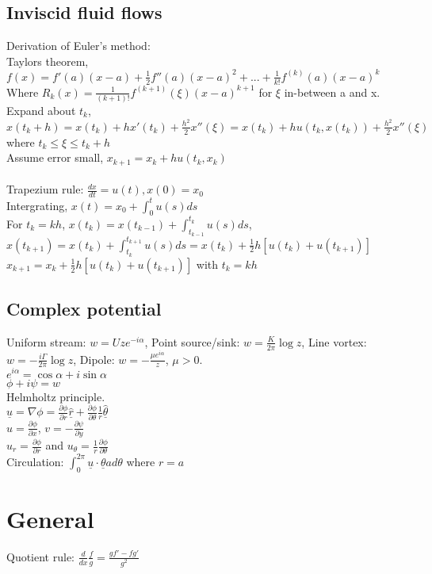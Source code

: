 \documentclass[1pt]{article}
\begin{document}
\subsection*{Inviscid fluid flows}
Derivation of Euler's method:
\\Taylors theorem, $f(x)=f'(a)(x-a)+\frac{1}{2}f''(a)(x-a)^2+...+\frac{1}{k!}f^{(k)}(a)(x-a)^k$
\\ Where $R_k(x)=\frac{1}{(k+1)!}f^{(k+1)}(\xi)(x-a)^{k+1}$ for $\xi$ in-between a and x.
\\Expand about $t_k$, $x(t_k+h)=x(t_k)+hx'(t_k)+\frac{h^2}{2}x''(\xi)=x(t_k)+hu(t_k,x(t_k))+\frac{h^2}{2}x''(\xi)$ where $t_k \leq \xi \leq t_k+h$
\\Assume error small, $x_{k+1}=x_k+hu(t_k,x_k)$
\\
\\Trapezium rule: $\frac{dx}{dt}=u(t), x(0)=x_0$
\\ Intergrating, $x(t)=x_0+\int_0^t u(s) ds$
\\For $t_k=kh$, $x(t_k)=x(t_{k-1})+\int_{t_{k-1}}^{t_k} u(s) ds$, 
\\$x(t_{k+1})=x(t_k)+\int_{t_k}^{t_{k+1}} u(s) ds = x(t_k)+\frac{1}{2}h[u(t_k)+u(t_{k+1})]$
\\$x_{k+1}=x_k+\frac{1}{2}h[u(t_k)+u(t_{k+1})]$ with $t_k=kh$


\subsection*{Complex potential}

Uniform stream: $w=Uze^{-i\alpha}$, Point source/sink: $w=\frac{K}{2\pi}\log z$, Line vortex: $w=-\frac{i\Gamma}{2\pi}\log z$, Dipole: $w=-\frac{\mu e^{i\alpha}}{z}$, $\mu>0$.
\\$e^{i\alpha}=\cos \alpha + i\sin \alpha$
\\$\phi+i\psi=w$
\\Helmholtz principle.
\\$\underline{u}=\nabla \phi= \frac{\partial \phi}{\partial r} \underline{\hat{r}}+\frac{\partial \phi}{\partial \theta}\frac{1}{r} \underline{\hat{\theta}}$
\\$u=\frac{\partial \phi}{\partial x}$, $v=-\frac{\partial \psi}{\partial y}$
\\$u_r=\frac{\partial \phi}{\partial r}$ and $u_{\theta}=\frac{1}{r}\frac{\partial \phi}{\partial \theta}$
\\Circulation: $\int_0^{2\pi} \underline{u}\cdot\underline{\theta}ad\theta$ where $r=a$

\section*{General}
Quotient rule: $\frac{d}{dx}\frac{f}{g}=\frac{gf'-fg'}{g^2}$
\end{document}
